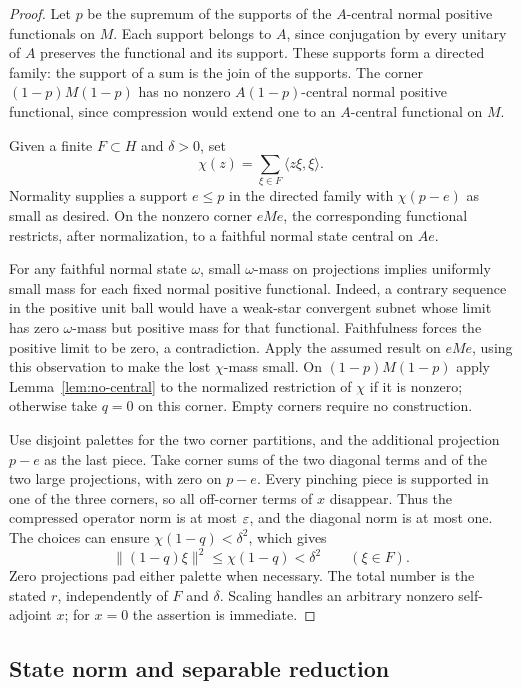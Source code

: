 \begin{proof}
Let $p$ be the supremum of the supports of the $A$-central normal
positive functionals on $M$.  Each support belongs to $A$, since
conjugation by every unitary of $A$ preserves the functional and its
support.  These supports form a directed family: the support of a sum
is the join of the supports.  The corner $(1-p)M(1-p)$ has no nonzero
$A(1-p)$-central normal positive functional, since compression would
extend one to an $A$-central functional on $M$.

Given a finite $F\subset H$ and $\delta>0$, set
\[
 \chi(z)=\sum_{\xi\in F}\langle z\xi,\xi\rangle.
\]
Normality supplies a support $e\leq p$ in the directed family with
$\chi(p-e)$ as small as desired.  On the nonzero corner $eMe$, the
corresponding functional restricts, after normalization, to a faithful
normal state central on $Ae$.

For any faithful normal state $\omega$, small $\omega$-mass on
projections implies uniformly small mass for each fixed normal positive
functional.  Indeed, a contrary sequence in the positive unit ball
would have a weak-star convergent subnet whose limit has zero
$\omega$-mass but positive mass for that functional.  Faithfulness
forces the positive limit to be zero, a contradiction.
Apply the assumed result on $eMe$, using this observation to make the
lost $\chi$-mass small.  On $(1-p)M(1-p)$ apply
Lemma~\ref{lem:no-central} to the normalized restriction of $\chi$ if
it is nonzero; otherwise take $q=0$ on this corner.  Empty corners
require no construction.

Use disjoint palettes for the two corner partitions, and the additional
projection $p-e$ as the last piece.  Take corner sums of the two
diagonal terms and of the two large projections, with zero on $p-e$.
Every pinching piece is supported in one of the three corners, so all
off-corner terms of $x$ disappear.  Thus the compressed operator norm
is at most $\varepsilon$, and the diagonal norm is at most one.  The choices
can ensure $\chi(1-q)<\delta^2$, which gives
\[
 \|(1-q)\xi\|^2\leq\chi(1-q)<\delta^2\qquad(\xi\in F).
\]
Zero projections pad either palette when necessary.  The total number
is the stated $r$, independently of $F$ and $\delta$.  Scaling handles
an arbitrary nonzero self-adjoint $x$; for $x=0$ the assertion is
immediate.
\end{proof}

\subsection{State norm and separable reduction}

